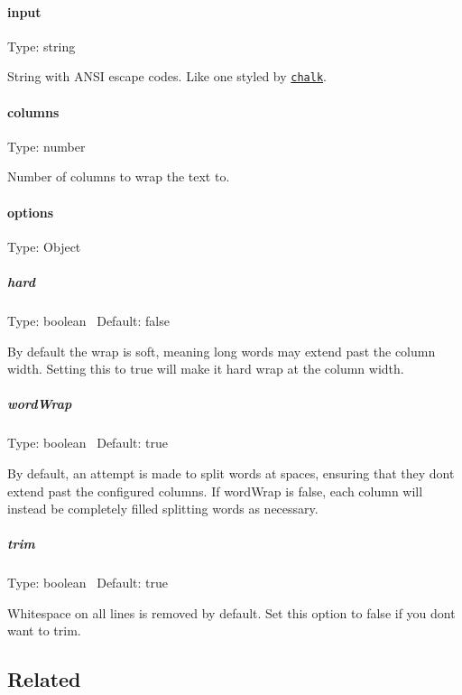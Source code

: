 \paragraph*{input}

Type\+: {\ttfamily string}

String with A\+N\+SI escape codes. Like one styled by \href{https://github.com/chalk/chalk}{\tt {\ttfamily chalk}}.

\paragraph*{columns}

Type\+: {\ttfamily number}

Number of columns to wrap the text to.

\paragraph*{options}

Type\+: {\ttfamily Object}

\subparagraph*{hard}

Type\+: {\ttfamily boolean}~\newline
 Default\+: {\ttfamily false}

By default the wrap is soft, meaning long words may extend past the column width. Setting this to {\ttfamily true} will make it hard wrap at the column width.

\subparagraph*{word\+Wrap}

Type\+: {\ttfamily boolean}~\newline
 Default\+: {\ttfamily true}

By default, an attempt is made to split words at spaces, ensuring that they don\textquotesingle{}t extend past the configured columns. If word\+Wrap is {\ttfamily false}, each column will instead be completely filled splitting words as necessary.

\subparagraph*{trim}

Type\+: {\ttfamily boolean}~\newline
 Default\+: {\ttfamily true}

Whitespace on all lines is removed by default. Set this option to {\ttfamily false} if you don\textquotesingle{}t want to trim.

\subsection*{Related}


